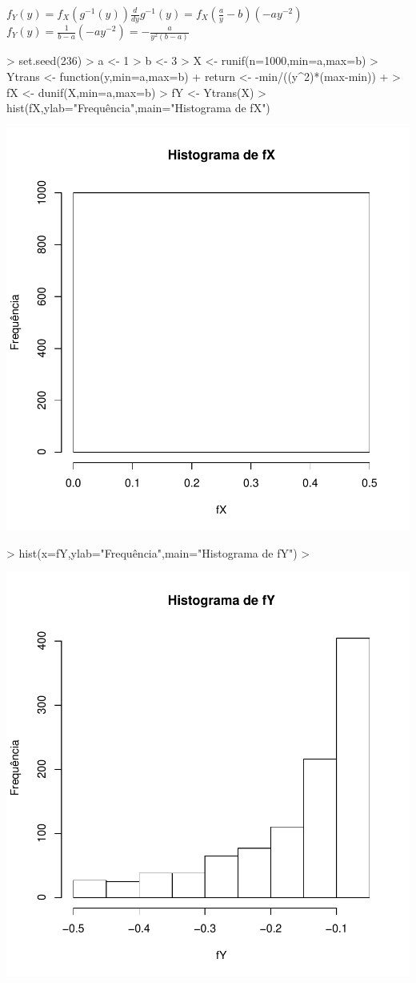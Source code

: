 \documentclass{article}
\begin{document}
  $f_Y(y) = f_X(g^{-1}(y))\frac{d}{dy}g^{-1}(y) = f_X(\frac{a}{y}-b)(-ay^{-2})$\\
  
  $f_Y(y) = \frac{1}{b-a}(-ay^{-2}) = -\frac{a}{y^2(b-a)}$
  
\begin{Schunk}
\begin{Sinput}
> set.seed(236)
> a <- 1
> b <- 3
> X <- runif(n=1000,min=a,max=b)
> Ytrans <- function(y,min=a,max=b){
+   return <- -min/((y^2)*(max-min))
+ }
> fX <- dunif(X,min=a,max=b)
> fY <- Ytrans(X)
> hist(fX,ylab="Frequência",main="Histograma de fX")
\end{Sinput}
\end{Schunk}
\includegraphics{transformacao-009}

\begin{Schunk}
\begin{Sinput}
> hist(x=fY,ylab="Frequência",main="Histograma de fY")
> 
\end{Sinput}
\end{Schunk}
\includegraphics{transformacao-010}
\end{document}
